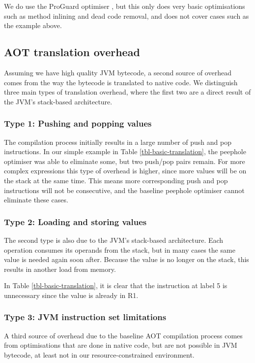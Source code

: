 We do use the ProGuard optimiser \cite{proguard}, but this only does very basic optimisations such as method inlining and dead code removal, and does not cover cases such as the example above.

\subsection{AOT translation overhead}
\label{sec-overhead-aot-translation}
Assuming we have high quality JVM bytecode, a second source of overhead comes from the way the bytecode is translated to native code. We distinguish three main types of translation overhead, where the first two are a direct result of the JVM's stack-based architecture.

\subsubsection{Type 1: Pushing and popping values} The compilation process initially results in a large number of push and pop instructions. In our simple example in Table \ref{tbl-basic-translation}, the peephole optimiser was able to eliminate some, but two push/pop pairs remain. For more complex expressions this type of overhead is higher, since more values will be on the stack at the same time. This means more corresponding push and pop instructions will not be consecutive, and the baseline peephole optimiser cannot eliminate these cases.

\subsubsection{Type 2: Loading and storing values} The second type is also due to the JVM's stack-based architecture. Each operation consumes its operands from the stack, but in many cases the same value is needed again soon after. Because the value is no longer on the stack, this results in another load from memory.

In Table \ref{tbl-basic-translation}, it is clear that the  instruction at label 5 is unnecessary since the value is already in R1.

\subsubsection{Type 3: JVM instruction set limitations} A third source of overhead due to the baseline AOT compilation process comes from optimisations that are done in native code, but are not possible in JVM bytecode, at least not in our resource-constrained environment.

